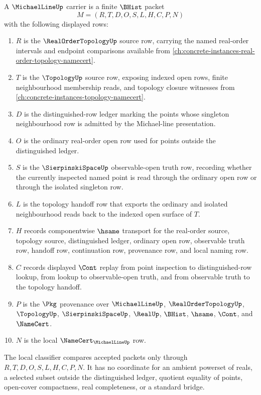 \begin{definition}
\label{def:michael-line-carrier}
A $\MichaelLineUp$ carrier is a finite $\BHist$ packet
$$
M=(R,T,D,O,S,L,H,C,P,N)
$$
with the following displayed rows:
\begin{enumerate}
\item $R$ is the $\RealOrderTopologyUp$ source row, carrying the named real-order intervals and endpoint comparisons available from \autoref{ch:concrete-instances-real-order-topology-namecert}.
\item $T$ is the $\TopologyUp$ source row, exposing indexed open rows, finite neighbourhood membership reads, and topology closure witnesses from \autoref{ch:concrete-instances-topology-namecert}.
\item $D$ is the distinguished-row ledger marking the points whose singleton neighbourhood row is admitted by the Michael-line presentation.
\item $O$ is the ordinary real-order open row used for points outside the distinguished ledger.
\item $S$ is the $\SierpinskiSpaceUp$ observable-open truth row, recording whether the currently inspected named point is read through the ordinary open row or through the isolated singleton row.
\item $L$ is the topology handoff row that exports the ordinary and isolated neighbourhood reads back to the indexed open surface of $T$.
\item $H$ records componentwise $\hsame$ transport for the real-order source, topology source, distinguished ledger, ordinary open row, observable truth row, handoff row, continuation row, provenance row, and local naming row.
\item $C$ records displayed $\Cont$ replay from point inspection to distinguished-row lookup, from lookup to observable-open truth, and from observable truth to the topology handoff.
\item $P$ is the $\Pkg$ provenance over $\MichaelLineUp$, $\RealOrderTopologyUp$, $\TopologyUp$, $\SierpinskiSpaceUp$, $\RealUp$, $\BHist$, $\hsame$, $\Cont$, and $\NameCert$.
\item $N$ is the local $\NameCert_{\MichaelLineUp}$ row.
\end{enumerate}
The local classifier compares accepted packets only through $R,T,D,O,S,L,H,C,P,N$. It has no coordinate for an ambient powerset of reals, a selected subset outside the distinguished ledger, quotient equality of points, open-cover compactness, real completeness, or a standard bridge.
\end{definition}

